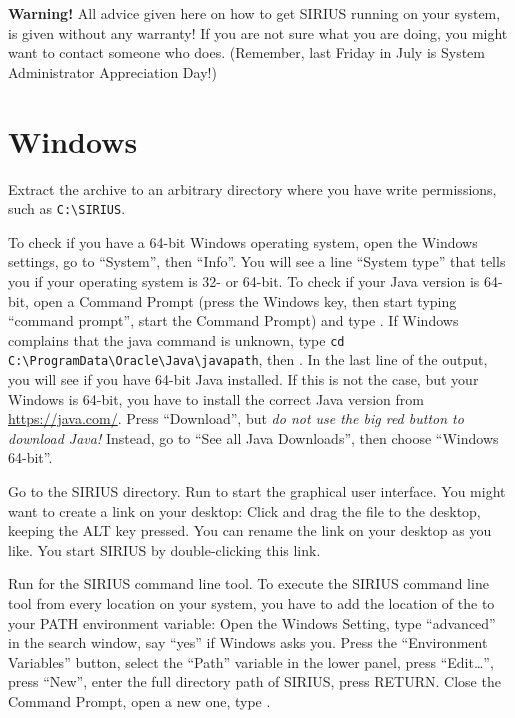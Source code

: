 \documentclass[letterpaper,10pt,openany,oneside]{sphinxmanual}
\begin{document}
\textbf{Warning!}  All advice given here on how to get SIRIUS running on your
system, is given without any warranty!  If you are not sure what you are
doing, you might want to contact someone who does.  (Remember, last Friday in
July is System Administrator Appreciation Day!)



\section{Windows}
\label{install:windows}

Extract the archive to an arbitrary directory where you have write
permissions, such as \verb|C:\SIRIUS|.

To check if you have a 64-bit Windows operating system, open the Windows
settings, go to ``System'', then ``Info''.  You will see a line ``System
type'' that tells you if your operating system is 32- or 64-bit.  To check if
your Java version is 64-bit, open a Command Prompt (press the Windows key,
then start typing ``command prompt'', start the Command Prompt) and
type .  If Windows complains that the java command is
unknown, type
\verb!cd C:\ProgramData\Oracle\Java\javapath!,
then .  In the last line of the output, you will see if
you have 64-bit Java installed.  If this is not the case, but your Windows is
64-bit, you have to install the correct Java version
from \url{https://java.com/}.  Press ``Download'', but \emph{do not use the
big red button to download Java!}  Instead, go to ``See all Java Downloads'',
then choose ``Windows 64-bit''.

Go to the SIRIUS directory.  Run  to start the
graphical user interface.  You might want to create a link on your desktop:
Click and drag the file  to the desktop, keeping the
ALT key pressed.  You can rename the link on your desktop as you like.  You
start SIRIUS by double-clicking this link.

Run  for the SIRIUS command line tool.  To
execute the SIRIUS command line tool from every location on your system,
you have to add the location of the  to your PATH
environment variable: Open the Windows Setting, type ``advanced'' in the
search window, say ``yes'' if Windows asks you.  Press the ``Environment
Variables'' button, select the ``Path'' variable in the lower panel, press
``Edit\dots'', press ``New'', enter the full directory path of SIRIUS,
press RETURN.  Close the Command Prompt, open a new one,
type .
\end{document}

